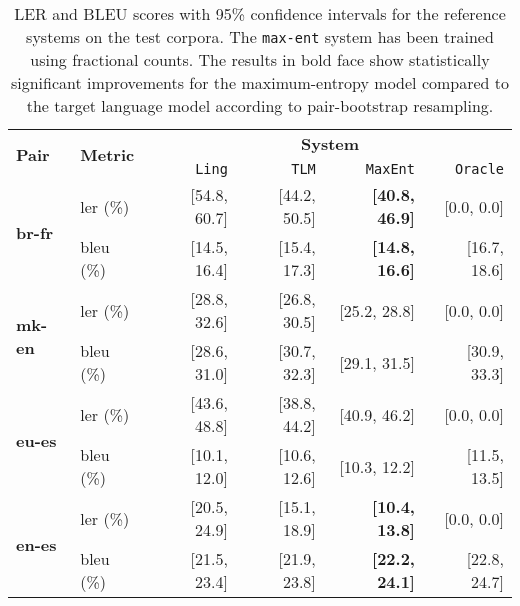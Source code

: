 \documentclass[11pt]{article}
\begin{document}
\begin{table}
 \begin{center}

  \begin{tabular}{|l|l|r|r|r||r|}
    \hline
    \multirow{2}{*}{{\bf Pair}}  & \multirow{2}{*}{{\bf Metric}} & \multicolumn{4}{|c|}{{\bf System}} \\ \cline{3-6}
                                 &              & {\tt Ling} & {\tt TLM} & \texttt{MaxEnt} & \texttt{Oracle} \\
    \hline %
    \multirow{2}{*}{{\bf br-fr}} & {\sc ler} (\%)     & [54.8, 60.7] & [44.2, 50.5]  & {\bf [40.8, 46.9]} & [0.0, 0.0]      \\ 
                                 & {\sc bleu} (\%)    & [14.5, 16.4] & [15.4, 17.3]  & {\bf [14.8, 16.6]} & [16.7, 18.6]     \\ 
    \hline %
    \multirow{2}{*}{{\bf mk-en}} & {\sc ler} (\%)     & [28.8, 32.6] & [26.8, 30.5]  & [25.2, 28.8] & [0.0, 0.0]    \\ 
                                 & {\sc bleu} (\%)    & [28.6, 31.0] & [30.7, 32.3]  & [29.1, 31.5] & [30.9, 33.3]    \\ 
    \hline %
    \multirow{2}{*}{{\bf eu-es}} & {\sc ler} (\%)      & [43.6, 48.8] & [38.8, 44.2]  & [40.9, 46.2] & [0.0, 0.0]     \\ 
                                 & {\sc bleu} (\%)     & [10.1, 12.0] & [10.6, 12.6]  & [10.3, 12.2] & [11.5, 13.5]     \\ 
    \hline %
    \multirow{2}{*}{{\bf en-es}} & {\sc ler} (\%)      & [20.5, 24.9] & [15.1, 18.9]  & {\bf [10.4, 13.8]} & [0.0, 0.0]     \\ 
                                 & {\sc bleu} (\%)     & [21.5, 23.4] & [21.9, 23.8]  & {\bf [22.2, 24.1]} & [22.8, 24.7]     \\ 
    \hline
  \end{tabular}

 \end{center}
 \caption{LER and BLEU scores with 95\% confidence intervals for the reference
   systems on the test corpora. The \texttt{max-ent} system has been trained using 
   fractional counts. The results in bold face show statistically significant
   improvements for the maximum-entropy model compared to the target language model 
   according to pair-bootstrap resampling.}
  \label{table:eval-mono-results}
\end{table}
\end{document}
